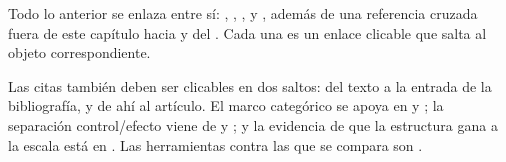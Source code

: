 Todo lo anterior se enlaza entre sí: , ,
,  y , además
de una referencia cruzada fuera de este capítulo hacia  y
 del . Cada una es un enlace
clicable que salta al objeto correspondiente.

Las citas también deben ser clicables en dos saltos: del texto a la entrada de la
bibliografía, y de ahí al artículo. El marco categórico se apoya en
\textcite{fongSpivak2019} y \textcite{selinger2010}; la separación control/efecto
viene de \textcite{moggi1991} y \textcite{powerRobinson1997}; y la evidencia de que
la estructura gana a la escala está en \parencite{alphaFold,deepseekV4}. Las
herramientas contra las que se compara son \parencite{langGraph,autoGen,dspy}.
